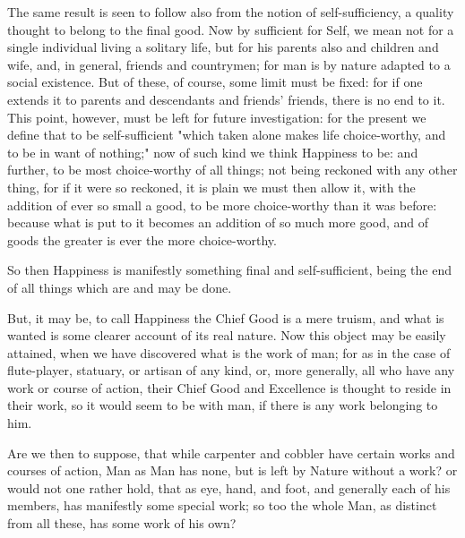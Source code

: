 The same result is seen to follow also from the notion of
self-sufficiency, a quality thought to belong to the final good. Now
by sufficient for Self, we mean not for a single individual living a
solitary life, but for his parents also and children and wife, and,
in general, friends and countrymen; for man is by nature adapted to a
social existence. But of these, of course, some limit must be fixed: for
if one extends it to parents and descendants and friends' friends,
there is no end to it. This point, however, must be left for future
investigation: for the present we define that to be self-sufficient
"which taken alone makes life choice-worthy, and to be in want of
nothing;" now of such kind we think Happiness to be: and further, to
be most choice-worthy of all things; not being reckoned with any other
thing, for if it were so reckoned, it is plain we must then allow it,
with the addition of ever so small a good, to be more choice-worthy than
it was before: because what is put to it becomes an addition of so much
more good, and of goods the greater is ever the more choice-worthy.

So then Happiness is manifestly something final and self-sufficient,
being the end of all things which are and may be done.

But, it may be, to call Happiness the Chief Good is a mere truism, and
what is wanted is some clearer account of its real nature. Now this
object may be easily attained, when we have discovered what is the work
of man; for as in the case of flute-player, statuary, or artisan of any
kind, or, more generally, all who have any work or course of action,
their Chief Good and Excellence is thought to reside in their work, so
it would seem to be with man, if there is any work belonging to him.

Are we then to suppose, that while carpenter and cobbler have certain
works and courses of action, Man as Man has none, but is left by Nature
without a work? or would not one rather hold, that as eye, hand, and
foot, and generally each of his members, has manifestly some special
work; so too the whole Man, as distinct from all these, has some work of
his own?

